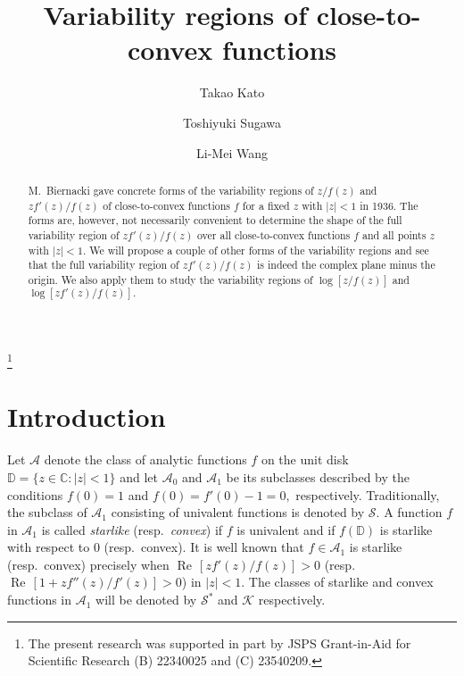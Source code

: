 \documentclass[a4paper,12pt]{amsart}
\numberwithin{equation}{section}
\theoremstyle{definition}
\begin{document}

\title{
Variability regions of close-to-convex functions
}

\author[T.~Kato]{Takao Kato}
\address{Graduate School of Science and Engineering,
Yamaguchi University, Yoshida, Yamaguchi 753-8512, Japan}
\author[T.~Sugawa]{Toshiyuki Sugawa}
\address{Graduate School of Information Sciences,
Tohoku University, Aoba-ku, Sendai 980-8579, Japan}
\author[L.-M.~Wang]{Li-Mei Wang}
\address{School of International Technology and Management,
University of International Business and Economics, No.~10, Huixin
Dongjie, Chaoyang District, Beijing 100009, China}
  
\begin{abstract}

M.~Biernacki gave concrete forms of the variability regions of
$z/f(z)$ and $zf'(z)/f(z)$ of close-to-convex functions $f$
for a fixed $z$ with $|z|<1$ in 1936.
The forms are, however, not necessarily convenient to determine the shape
of the full variability region of $zf'(z)/f(z)$ over all
close-to-convex functions $f$ and all points $z$ with $|z|<1.$
We will propose a couple of other forms of the variability regions
and see that the full variability region of $zf'(z)/f(z)$
is indeed the complex plane minus the origin.
We also apply them to study the variability regions of
$\log[z/f(z)]$ and $\log[zf'(z)/f(z)].$
\end{abstract}
\thanks{
The present research was supported in part by JSPS Grant-in-Aid for
Scientific Research (B) 22340025 and (C) 23540209.
}
\maketitle

\section{Introduction}
Let ${{\mathcal A}}$ denote the class of analytic functions $f$ on the unit disk
${{\mathbb D}}=\{z\in{{\mathbb C}}: |z|<1\}$ and let ${{\mathcal A}}_0$ and ${{\mathcal A}}_1$ be its subclasses
described by the conditions $f(0)=1$ and $f(0)=f'(0)-1=0,$ respectively.
Traditionally, the subclass of ${{\mathcal A}}_1$ consisting of univalent functions
is denoted by ${{\mathcal S}}.$
A function $f$ in ${{\mathcal A}}_1$ is called {\it starlike} (resp.~{\it convex})
if $f$ is univalent and if
$f({{\mathbb D}})$ is starlike with respect to $0$ (resp.~convex).
It is well known that $f\in{{\mathcal A}}_1$ is starlike (resp.~convex) precisely when
${{\operatorname{Re}\,}} [zf'(z)/f(z)]>0$ (resp.~${{\operatorname{Re}\,}}[1+zf''(z)/f'(z)]>0$) in $|z|<1.$
The classes of starlike and convex functions in ${{\mathcal A}}_1$ will be denoted
by ${{\mathcal S}}^*$ and ${{\mathcal K}}$ respectively.
\end{document}
